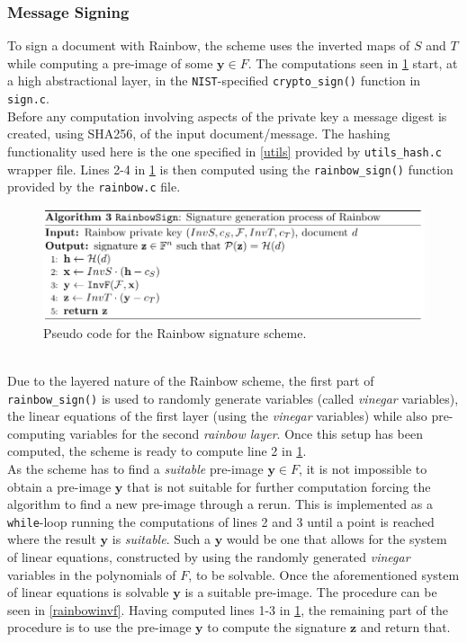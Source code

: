 \subsubsection{Message Signing} \label{section:message_sign}
To sign a document with Rainbow, the scheme uses the inverted maps of $S$ and $T$ while computing a pre-image of some $\textbf{y} \in F$. The computations seen in \cref{rainbowsign} start, at a high abstractional layer, in the \texttt{NIST}-specified \texttt{crypto\_sign()} function in \texttt{sign.c}.\medskip\\
Before any computation involving aspects of the private key a message digest is created, using SHA256, of the input document/message. The hashing functionality used here is the one specified in \cref{utils} provided by \texttt{utils\_hash.c} wrapper file. Lines 2-4 in \cref{rainbowsign} is then computed using the \texttt{rainbow\_sign()} function provided by the \texttt{rainbow.c} file.
\begin{figure}[t]
    \centering
    \includegraphics[width=\textwidth]{resources/rainbowsign.png}
    \caption{Pseudo code for the Rainbow signature scheme.}
    \label{rainbowsign}
\end{figure}\\
Due to the layered nature of the Rainbow scheme, the first part of \texttt{rainbow\_sign()} is used to randomly generate variables (called \emph{vinegar} variables), the linear equations of the first layer (using the \emph{vinegar} variables) while also pre-computing variables for the second \emph{rainbow layer}. Once this setup has been computed, the scheme is ready to compute line 2 in \cref{rainbowsign}.\medskip\\
As the scheme has to find a \emph{suitable} pre-image $\textbf{y} \in F$, it is not impossible to obtain a pre-image $\textbf{y}$ that is not suitable for further computation forcing the algorithm to find a new pre-image through a rerun. This is implemented as a \texttt{while}-loop running the computations of lines 2 and 3 until a point is reached where the result $\textbf{y}$ is \emph{suitable}. Such a $\textbf{y}$ would be one that allows for the system of linear equations, constructed by using the randomly generated \emph{vinegar} variables in the polynomials of $F$, to be solvable. Once the aforementioned system of linear equations is solvable $\textbf{y}$ is a suitable pre-image. The procedure can be seen in \cref{rainbowinvf}. Having computed lines 1-3 in \cref{rainbowsign}, the remaining part of the procedure is to use the pre-image $\textbf{y}$ to compute the signature $\textbf{z}$ and return that.
